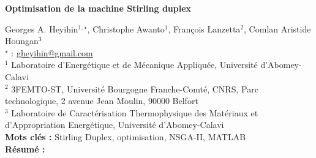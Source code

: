 


    \newpage


%
\begin{flushleft}
\addtocounter{section}{1}
{\Large \textbf{Optimisation de la machine Stirling duplex}}\label{ref:75}
\end{flushleft}
%
Georges A. Heyihin$^{1,\star}$, Christophe Awanto$^{1}$, François Lanzetta$^{2}$, Comlan Aristide Houngan$^{3}$\\[2mm]
$^{\star}$ \Letter : \url{gheyihin@gmail.com}\\[2mm]
{\footnotesize $^{1}$ Laboratoire d'Energétique et de Mécanique Appliquée, Université d'Abomey-Calavi}\\
{\footnotesize $^{2}$ 3FEMTO-ST, Université Bourgogne Franche-Comté, CNRS, Parc technologique, 2 avenue Jean Moulin, 90000 Belfort}\\
{\footnotesize $^{3}$ Laboratoire de Caractérisation Thermophysique des Matériaux et d'Appropriation Energétique, Université d'Abomey-Calavi}\\
[4mm]
%
\noindent \textbf{Mots clés : } Stirling Duplex, optimisation, NSGA-II, MATLAB\\[4mm]
%
\noindent \textbf{Résumé : } 


